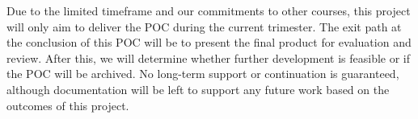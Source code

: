 \documentclass{article}
\begin{document}
\newline\newline
Due to the limited timeframe and our commitments to other courses, this project will only aim to deliver the POC during the current trimester. The exit path at the conclusion of this POC will be to present the final product for evaluation and review. After this, we will determine whether further development is feasible or if the POC will be archived. No long-term support or continuation is guaranteed, although documentation will be left to support any future work based on the outcomes of this project.
\end{document}
